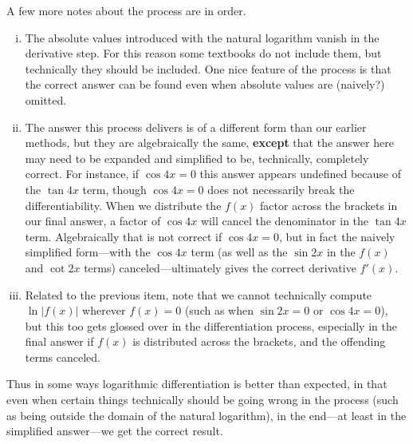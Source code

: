 \eex

A few more notes about the process are in order.
\begin{enumerate}[(i)]
\item The absolute values introduced with the natural 
      logarithm vanish in the derivative step.  For this
      reason some textbooks do not include them, but
      technically they should be included.  One nice
      feature of the process is that the correct answer
      can be found even when absolute values are (naively?) omitted.
\item The answer this process delivers is of a different
      form than our earlier methods, but they are algebraically
      the same, {\bf except} that the answer here may need to
      be expanded and simplified to be, technically, completely 
      correct.  For instance, if $\cos4x=0$
      this answer appears undefined because of the $\tan4x$ 
      term, though $\cos4x=0$ does not necessarily 
      break the differentiability.  When we distribute
      the $f(x)$ factor across the brackets in our final answer, 
      a factor of $\cos4x$ will cancel the denominator
      in the $\tan4x$ term.  Algebraically that is not
      correct if $\cos4x=0$, but in fact the naively
      simplified form---with the $\cos4x$ term (as well
      as the $\sin 2x$ in the $f(x)$ and $\cot2x$ terms) 
      canceled---ultimately 
      gives the correct derivative $f'(x)$.
\item Related to the previous item, note that we cannot technically
      compute $\ln|f(x)|$ wherever $f(x)=0$ (such as when
      $\sin2x=0$ or $\cos4x=0$), but this too
      gets glossed over in the differentiation process,
      especially in the final answer if $f(x)$ is distributed
      across the brackets, and the offending terms canceled.
\end{enumerate}
Thus in some ways logarithmic differentiation is better than
expected, in that even when certain things technically
should be going wrong in the process (such as being outside
the domain of the natural logarithm), in the end---at least
in the simplified answer---we get the correct result.

